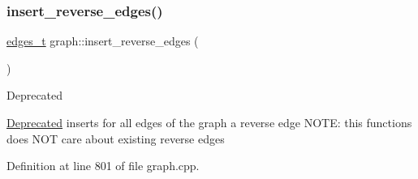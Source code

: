 \subsubsection{\texorpdfstring{insert\+\_\+reverse\+\_\+edges()}{insert\_reverse\_edges()}}
{\footnotesize\ttfamily \mbox{\hyperlink{edge_8h_a8f9587479bda6cf612c103494b3858e3}{edges\+\_\+t}} graph\+::insert\+\_\+reverse\+\_\+edges (\begin{DoxyParamCaption}{ }\end{DoxyParamCaption})}

\begin{DoxyRefDesc}{Deprecated}
\item[\mbox{\hyperlink{deprecated__deprecated000006}{Deprecated}}]inserts for all edges of the graph a reverse edge N\+O\+TE\+: this functions does N\+OT care about existing reverse edges \end{DoxyRefDesc}


Definition at line 801 of file graph.\+cpp.


